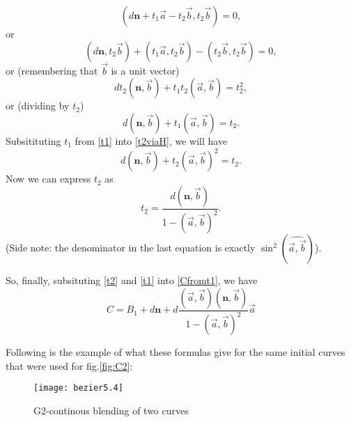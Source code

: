 \documentclass[12pt,a4paper]{article}
\begin{document}
$$
(d\mathbf{n} + t_1\vec{a} - t_2\vec{b}, t_2\vec{b}) = 0,
$$
or
$$
(d\mathbf{n}, t_2\vec{b}) + (t_1\vec{a}, t_2\vec{b}) - (t_2\vec{b}, t_2\vec{b}) = 0,
$$
or (remembering that $\vec{b}$ is a unit vector)
$$
dt_2(\mathbf{n},\vec{b}) + t_1t_2(\vec{a}, \vec{b}) = t_2^2,
$$
or (dividing by $t_2$)
\begin{equation}\label{t2viaH}
d(\mathbf{n}, \vec{b}) + t_1(\vec{a}, \vec{b}) = t_2.
\end{equation}
Subsitituting $t_1$ from \eqref{t1} into \eqref{t2viaH}, we will have
$$
d(\mathbf{n}, \vec{b}) + t_2(\vec{a}, \vec{b})^2 = t_2.
$$
Now we can express $t_2$ as
\begin{equation}\label{t2}
  t_2 = \frac{d(\mathbf{n}, \vec{b})}{1 - (\vec{a}, \vec{b})^2}.
\end{equation}
(Side note: the denominator in the last equation is exactly $\sin^2(\widehat{\vec{a}, \vec{b}})$).

So, finally, subsituting \eqref{t2} and \eqref{t1} into \eqref{Cfromt1}, we have
\begin{equation}
  C = B_1 + d\mathbf{n} + d\frac{(\vec{a}, \vec{b})(\mathbf{n}, \vec{b})}{1 - (\vec{a}, \vec{b})^2}\vec{a}
\end{equation}

Following is the example of what these formulas give for the same initial curves that were used for fig.\ref{fig:C2}:
\begin{figure}[ht]
  \caption{G2-continous blending of two curves}
  \texttt{[image: bezier5.4]}
  \centering
\end{figure}
\end{document}
